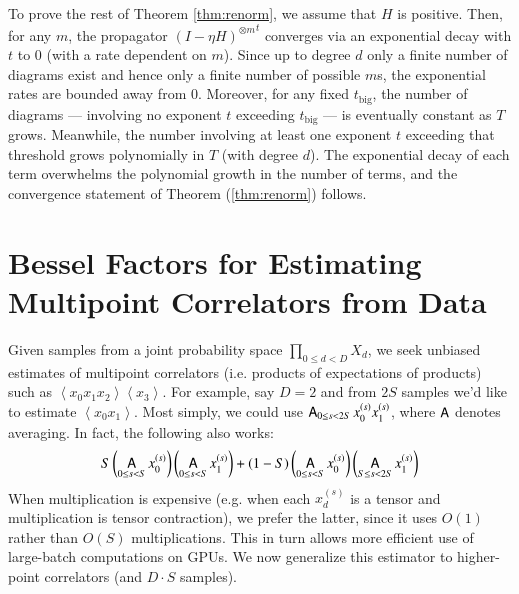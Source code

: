 \documentclass{article}
\theoremstyle{plain}
\theoremstyle{definition}
\newcommand{\wrap}[1]{\left(#1\right)}
\newcommand{\wang}[1]{\left\langle#1\right\rangle}
\DeclareMathOperator*{\Avg}{\text{\sffamily A}}
\begin{document}
            To prove the rest of Theorem \ref{thm:renorm}, we assume that $H$
            is positive.  Then, for any $m$, the propagator ${(I-\eta
            H)^{\otimes m}}^t$ converges via an exponential decay with $t$ to
            $0$ (with a rate dependent on $m$).
            Since up to degree $d$ only a finite number of diagrams exist and
            hence only a finite number of possible $m$s, the exponential rates
            are bounded away from $0$.  Moreover, for any fixed
            $t_{\text{big}}$, the number of diagrams --- involving no exponent
            $t$ exceeding  $t_{\text{big}}$ --- is eventually constant as $T$
            grows.  Meanwhile, the number involving at least one exponent $t$
            exceeding that threshold grows polynomially in $T$ (with degree
            $d$).  The exponential decay of each term overwhelms the polynomial
            growth in the number of terms, and the convergence statement of
            Theorem (\ref{thm:renorm}) follows.


\section{Bessel Factors for Estimating Multipoint Correlators from Data}\label{sect:bessel}

    Given samples from a joint probability space $\prod_{0\leq d<D} X_d$, we
    seek unbiased estimates of multipoint correlators (i.e. products of
    expectations of products) such as $\wang{x_0 x_1 x_2}\wang{x_3}$.  For
    example, say $D=2$ and from $2S$ samples we'd like to estimate $\wang{x_0
    x_1}$.  Most simply, we could use $\Avg_{0\leq s<2S} x_0^{(s)} x_1^{(s)}$,
    where $\Avg$ denotes averaging.  In fact, the following also works:
    \begin{equation} \label{eq:bessel}
        S
        \wrap{\Avg_{0\leq s< S} x_0^{(s)}}
        \wrap{\Avg_{0\leq s< S} x_1^{(s)}}
        +
        (1-S)
        \wrap{\Avg_{0\leq s< S} x_0^{(s)}}
        \wrap{\Avg_{S\leq s<2S} x_1^{(s)}}
    \end{equation}
    When multiplication is expensive (e.g. when each $x_d^{(s)}$ is a tensor
    and multiplication is tensor contraction), we prefer the latter, since it
    uses $O(1)$ rather than $O(S)$ multiplications.  This in turn allows more
    efficient use of large-batch computations on GPUs.  We now generalize this
    estimator to higher-point correlators (and $D\cdot S$ samples).
\end{document}
